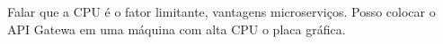 Falar que a CPU é o fator limitante, vantagens microserviços. Posso colocar o API Gatewa em uma máquina com alta CPU o placa gráfica.